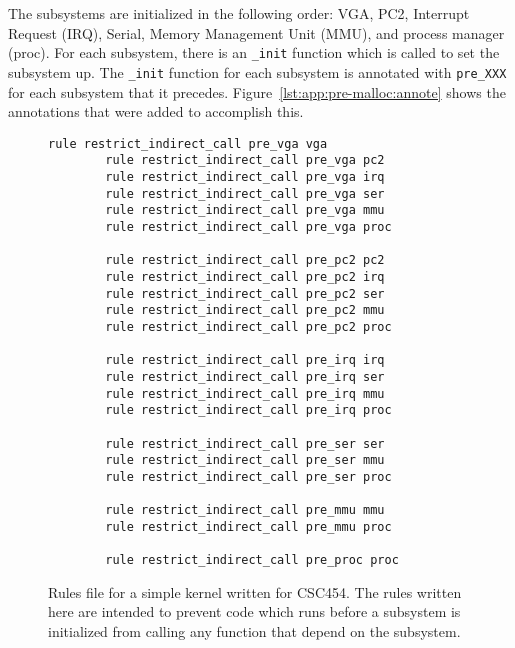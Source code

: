 The subsystems are initialized in the following order: VGA, PC2, Interrupt Request (IRQ), Serial, Memory Management Unit (MMU), and process manager (proc).  For each subsystem, there is an \lstinline{_init} function which is called to set the subsystem up.  The \lstinline{_init} function for each subsystem is annotated with \lstinline{pre_XXX} for each subsystem that it precedes.  Figure~\ref{lst:app:pre-malloc:annote} shows the annotations that were added to accomplish this.

\begin{figure}
    \begin{lstlisting}[gobble=8]
        rule restrict_indirect_call pre_vga vga
        rule restrict_indirect_call pre_vga pc2
        rule restrict_indirect_call pre_vga irq
        rule restrict_indirect_call pre_vga ser
        rule restrict_indirect_call pre_vga mmu
        rule restrict_indirect_call pre_vga proc

        rule restrict_indirect_call pre_pc2 pc2
        rule restrict_indirect_call pre_pc2 irq
        rule restrict_indirect_call pre_pc2 ser
        rule restrict_indirect_call pre_pc2 mmu
        rule restrict_indirect_call pre_pc2 proc

        rule restrict_indirect_call pre_irq irq
        rule restrict_indirect_call pre_irq ser
        rule restrict_indirect_call pre_irq mmu
        rule restrict_indirect_call pre_irq proc

        rule restrict_indirect_call pre_ser ser
        rule restrict_indirect_call pre_ser mmu
        rule restrict_indirect_call pre_ser proc

        rule restrict_indirect_call pre_mmu mmu
        rule restrict_indirect_call pre_mmu proc

        rule restrict_indirect_call pre_proc proc
    \end{lstlisting}
    \caption{Rules file for a simple kernel written for CSC454.  The rules written here are intended to prevent code which runs before a subsystem is initialized from calling any function that depend on the subsystem.}
    \label{lst:app:pre-malloc:rules}
\end{figure}


